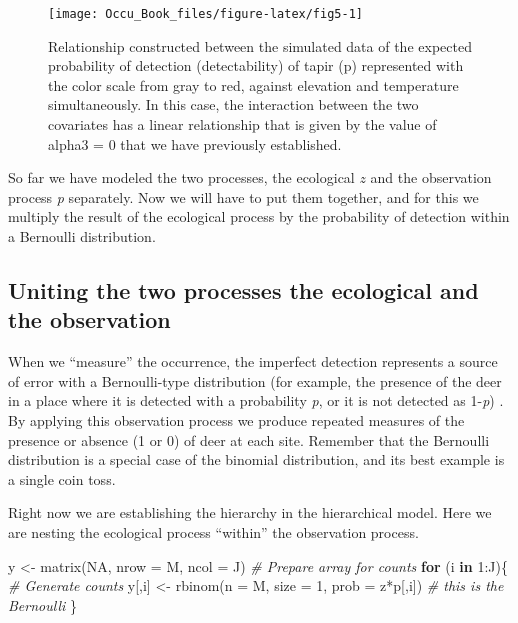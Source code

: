 \documentclass[
]{book}
\newenvironment{Shaded}{\begin{snugshade}}{\end{snugshade}}
\newcommand{\AttributeTok}[1]{\textcolor[rgb]{0.77,0.63,0.00}{#1}}
\newcommand{\CommentTok}[1]{\textcolor[rgb]{0.56,0.35,0.01}{\textit{#1}}}
\newcommand{\ConstantTok}[1]{\textcolor[rgb]{0.00,0.00,0.00}{#1}}
\newcommand{\ControlFlowTok}[1]{\textcolor[rgb]{0.13,0.29,0.53}{\textbf{#1}}}
\newcommand{\DecValTok}[1]{\textcolor[rgb]{0.00,0.00,0.81}{#1}}
\newcommand{\FunctionTok}[1]{\textcolor[rgb]{0.00,0.00,0.00}{#1}}
\newcommand{\NormalTok}[1]{#1}
\newcommand{\OtherTok}[1]{\textcolor[rgb]{0.56,0.35,0.01}{#1}}
\newcommand{\SpecialCharTok}[1]{\textcolor[rgb]{0.00,0.00,0.00}{#1}}
\begin{document}
\begin{figure}
\texttt{[image: Occu\_Book\_files/figure-latex/fig5-1]} \caption[fig5]{Relationship constructed between the simulated data of the expected probability of detection (detectability) of tapir (p) represented with the color scale from gray to red, against elevation and temperature simultaneously. In this case, the interaction between the two covariates has a linear relationship that is given by the value of alpha3 = 0 that we have previously established.}\label{fig:fig5}
\end{figure}

So far we have modeled the two processes, the ecological \(z\) and the observation process \emph{p} separately. Now we will have to put them together, and for this we multiply the result of the ecological process by the probability of detection within a Bernoulli distribution.

\hypertarget{uniting-the-two-processes-the-ecological-and-the-observation}{%
\subsection{Uniting the two processes the ecological and the observation}\label{uniting-the-two-processes-the-ecological-and-the-observation}}

When we ``measure'' the occurrence, the imperfect detection represents a source of error with a Bernoulli-type distribution (for example, the presence of the deer in a place where it is detected with a probability \emph{p}, or it is not detected as 1-\emph{p}) . By applying this observation process we produce repeated measures of the presence or absence (1 or 0) of deer at each site. Remember that the Bernoulli distribution is a special case of the binomial distribution, and its best example is a single coin toss.

Right now we are establishing the hierarchy in the hierarchical model. Here we are nesting the ecological process ``within'' the observation process.

\begin{Shaded}
\begin{Highlighting}[]
\NormalTok{y }\OtherTok{\textless{}{-}} \FunctionTok{matrix}\NormalTok{(}\ConstantTok{NA}\NormalTok{, }\AttributeTok{nrow =}\NormalTok{ M, }\AttributeTok{ncol =}\NormalTok{ J)      }\CommentTok{\# Prepare array for counts}
\ControlFlowTok{for}\NormalTok{ (i }\ControlFlowTok{in} \DecValTok{1}\SpecialCharTok{:}\NormalTok{J)\{                          }\CommentTok{\# Generate counts}
\NormalTok{   y[,i] }\OtherTok{\textless{}{-}} \FunctionTok{rbinom}\NormalTok{(}\AttributeTok{n =}\NormalTok{ M, }\AttributeTok{size =} \DecValTok{1}\NormalTok{, }\AttributeTok{prob =}\NormalTok{ z}\SpecialCharTok{*}\NormalTok{p[,i])   }\CommentTok{\# this is the Bernoulli}
\NormalTok{\}}
\end{Highlighting}
\end{Shaded}
\end{document}
